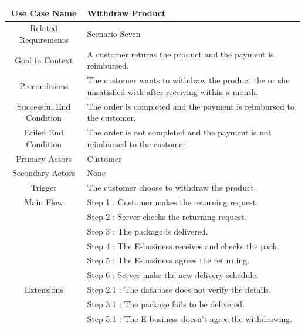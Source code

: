 \documentclass[12pt]{scrreprt}
\begin{document}
\begin{table}[H]
  \centering
  \begin{tabular}{| c | p{11cm} |}
    \hline
    Use Case Name & Withdraw Product\\
    \hline
    Related Requirements & Scenario Seven\\
    \hline
    Goal in Context & A customer returns the product and the payment is
    reimbursed.\\
    \hline
    Preconditions & The customer wants to withdraw the product the or she
    unsatisfied with after receiving within a month.\\
    \hline
    Successful End Condition & The order is completed and the payment is
    reimbursed to the customer.\\
    \hline
    Failed End Condition & The order is not completed and the payment is not
    reimbursed to the customer.\\
    \hline
    Primary Actors & Customer\\
    \hline
    Secondary Actors & None\\
    \hline
    Trigger & The customer choose to withdraw the product.\\
    \hline
    Main Flow & Step 1 : Customer makes the returning request.\\
    & Step 2 : Server checks the returning request.\\
    & Step 3 : The package is delivered.\\
    & Step 4 : The E-business receives and checks the pack.\\
    & Step 5 : The E-business agrees the returning.\\
    & Step 6 : Server make the new delivery schedule.\\
    \hline
    Extensions & Step 2.1 : The database does not verify the details.\\
    & Step 3.1 : The package fails to be delivered.\\
    & Step 5.1 : The E-business doesn't agree the withdrawing.\\
    \hline
  \end{tabular}
\end{table}
\end{document}
